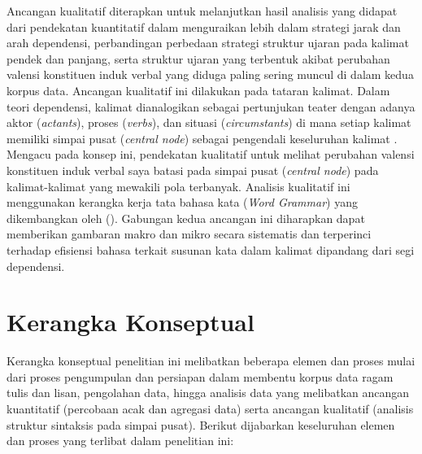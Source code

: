 Ancangan kualitatif diterapkan untuk melanjutkan hasil analisis yang didapat dari pendekatan kuantitatif dalam menguraikan lebih dalam strategi jarak dan arah dependensi, perbandingan perbedaan strategi struktur ujaran pada kalimat pendek dan panjang, serta struktur ujaran yang terbentuk akibat perubahan valensi konstituen induk verbal yang diduga paling sering muncul di dalam kedua korpus data. Ancangan kualitatif ini dilakukan pada tataran kalimat. Dalam teori dependensi, kalimat dianalogikan sebagai pertunjukan teater dengan adanya aktor (\textit{actants}), proses (\textit{verbs}), dan situasi (\textit{circumstants}) di mana setiap kalimat memiliki simpai pusat (\textit{central node}) sebagai pengendali keseluruhan kalimat \citep{tesniere1959elements}. Mengacu pada konsep ini, pendekatan kualitatif untuk melihat perubahan valensi konstituen induk verbal saya batasi pada simpai pusat (\textit{central node}) pada kalimat-kalimat yang mewakili pola terbanyak. Analisis kualitatif ini menggunakan kerangka kerja tata bahasa kata (\textit{Word Grammar}) yang dikembangkan oleh (\citealp{hudson1984word,hudson2007language}). Gabungan kedua ancangan ini diharapkan dapat memberikan gambaran makro dan mikro secara sistematis dan terperinci terhadap efisiensi bahasa terkait susunan kata dalam kalimat dipandang dari segi dependensi. 



\section{Kerangka Konseptual}

Kerangka konseptual penelitian ini melibatkan beberapa elemen dan proses mulai dari proses pengumpulan dan persiapan dalam membentu korpus data ragam tulis dan lisan, pengolahan data, hingga analisis data yang melibatkan ancangan kuantitatif (percobaan acak dan agregasi data) serta ancangan kualitatif (analisis struktur sintaksis pada simpai pusat). Berikut dijabarkan keseluruhan elemen dan proses yang terlibat dalam penelitian ini:


